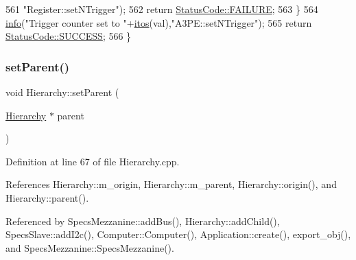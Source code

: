 \begin{DoxyCode}
561         \textcolor{stringliteral}{"Register::setNTrigger"});
562     \textcolor{keywordflow}{return} \hyperlink{classStatusCode_a6f565cbeadc76d14c72f047e5e85eb4ba3da73d4c469762eb9d3c960368252b26}{StatusCode::FAILURE};
563   \}
564   \hyperlink{classObject_a644fd329ea4cb85f54fa6846484b84a8}{info}(\textcolor{stringliteral}{"Trigger counter set to "}+\hyperlink{Tools_8h_af330027dbdafb9a30768b3613c553e60}{itos}(val),\textcolor{stringliteral}{"A3PE::setNTrigger"});
565   \textcolor{keywordflow}{return} \hyperlink{classStatusCode_a6f565cbeadc76d14c72f047e5e85eb4badd0da38d3ba0d922efd1f4619bc37ad8}{StatusCode::SUCCESS};
566 \}
\end{DoxyCode}
\mbox{\label{classHierarchy_a585ad1aeec16077a0e532ab8b4fc557b}} 
\subsubsection{\texorpdfstring{set\+Parent()}{setParent()}}
{\footnotesize\ttfamily void Hierarchy\+::set\+Parent (\begin{DoxyParamCaption}\item[{\hyperlink{classHierarchy}{Hierarchy} $\ast$}]{parent }\end{DoxyParamCaption})\hspace{0.3cm}{\ttfamily [inherited]}}



Definition at line 67 of file Hierarchy.\+cpp.



References Hierarchy\+::m\+\_\+origin, Hierarchy\+::m\+\_\+parent, Hierarchy\+::origin(), and Hierarchy\+::parent().



Referenced by Specs\+Mezzanine\+::add\+Bus(), Hierarchy\+::add\+Child(), Specs\+Slave\+::add\+I2c(), Computer\+::\+Computer(), Application\+::create(), export\+\_\+obj(), and Specs\+Mezzanine\+::\+Specs\+Mezzanine().


